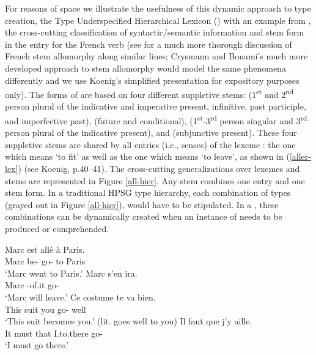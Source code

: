 \documentclass[output=paper]{langsci/langscibook}
\begin{document}
For reasons of space we illustrate the usefulness of this dynamic approach to type creation, the Type Underspecified Hierarchical Lexicon ()  with an example from \citet{Koenig1999c}, the cross-cutting classification of syntactic/semantic information and stem form in the entry for the French verb  (see \citet{BonamiandBoye2001} for a much more thorough discussion of French stem allomorphy along similar lines; Crysmann and Bonami's much more developed approach to stem allomorphy would model the same phenomena differently and we use Koenig's simplified presentation for expository purposes only). The forms of  are based on four different suppletive stems:  (1\textsuperscript{st} and 2\textsuperscript{nd} person plural of the indicative and imperative present, infinitive, past participle, and imperfective past),  (future and conditional),  (1\textsuperscript{st}-3\textsuperscript{rd} person singular and 3\textsuperscript{rd} person plural of the indicative present), and  (subjunctive present). These four suppletive stems are shared by all entries (i.e., senses) of the lexeme : the one which means `to fit' as well as the one which means `to leave', as shown in (\ref{aller-lex}) (see Koenig, p.40--41). The cross-cutting generalizations over lexemes and stems are represented in Figure \ref{all-hier}. Any  stem combines one entry and one stem form. In a traditional HPSG type hierarchy, each combination of types (grayed out in Figure \ref{all-hier}), would have to be stipulated. In a , these combinations can be dynamically created when an instance of  needs to be produced or comprehended.

\begin{exe}
	\ex\label{aller-lex}
	\begin{xlist}
		\ex\label{aller-lex-a}
		\gll Marc est allé à Paris. \\
		Marc be- go- to Paris \\
		\glt `Marc went to Paris.'
		\ex\label{aller-lex-b}
		\gll Marc s'en ira. \\
		Marc -of.it go- \\
		`Marc will leave.'
		\ex\label{aller-lex-c}
		\gll Ce costume te va bien. \\
		This suit you go- well \\
		\glt `This suit becomes you.' (lit. goes well to you)
		\ex\label{aller-lex-d}
		\gll Il faut que j'y aille. \\
		It must that I.to.there go- \\
		\glt `I must go there.'
	\end{xlist}	
\end{exe}
\end{document}

